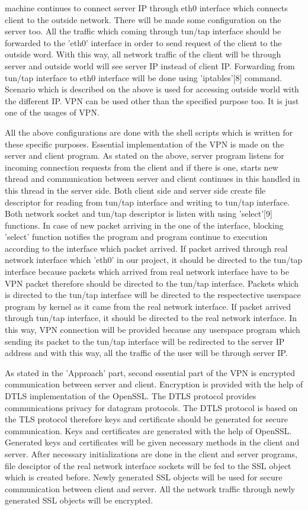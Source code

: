 \documentclass[letterpaper, 10 pt, conference]{ieeeconf}  %
\begin{document}
machine continues to connect server IP through eth0 interface which connects client to the outside network. There will be made some configuration on the server too. All the traffic which coming through tun/tap interface should be forwarded to the 'eth0' interface in order to send request of the client to the outside word. With this way, all network traffic of the client will be through server and outside world will see server IP instead of client IP. Forwarding from tun/tap interface to eth0 interface will be done using 'iptables'[8] command. 
Scenario which is described on the above is used for accessing outside world with the different IP. VPN can be used other than the specified purpose too. It is just one of the usages of VPN. 

All the above configurations are done with the shell scripts which is written for these specific purposes. Essential implementation of the VPN is made on the server and client program. As stated on the above, server program listens for incoming connection requests from the client and if there is one, starts new thread and communication between server and client continues in this handled in this thread in the server side. Both client side and server side create file descriptor for reading from tun/tap interface and writing to tun/tap interface. Both network socket and tun/tap descriptor is listen with using 'select'[9] functions. In case of new packet arriving in the one of the interface, blocking 'select' function notifies the program and program continue to execution according to the interface which packet arrived. If packet arrived through real network interface which 'eth0' in our project, it should be directed to the tun/tap interface because packets which arrived from real network interface have to be VPN packet therefore should be directed to the tun/tap interface. Packets which is directed to the tun/tap interface will be directed to the respectective userspace program by kernel as it came from the real network interface. If packet arrived through tun/tap interface, it should be directed to the real network interface. In this way, VPN connection will be provided because any userspace program which sending its packet to the tun/tap interface will be redirected to the server IP address and with this way, all the traffic of the user will be through server IP. 

As stated in the 'Approach' part, second essential part of the VPN is encrypted communication between server and client. Encryption is provided with the help of DTLS implementation of the OpenSSL. The DTLS protocol provides communications privacy for datagram protocols. The DTLS protocol is based on the TLS protocol therefore keys and certificate should be generated for secure communication. Keys and certificates are generated with the help of OpenSSL. Generated keys and certificates will be given  necessary methods in the client and server. After necessary initializations are done in the client and server programs, file desciptor of the real network interface sockets will be fed to the SSL object which is created before. Newly generated SSL objects will be used for secure communication between client and server. All the network traffic through newly generated SSL objects will be encrypted.
\end{document}
